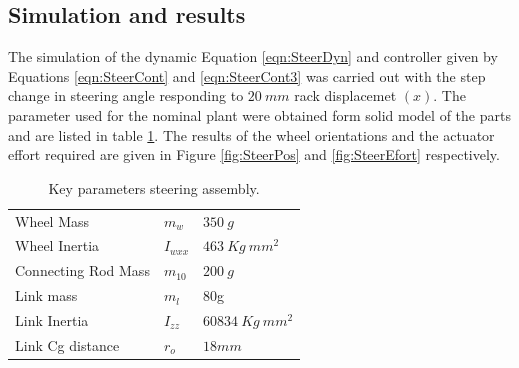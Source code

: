 \subsection{Simulation and results}
The simulation of the  dynamic Equation \ref{eqn:SteerDyn} and controller given by Equations \ref{eqn:SteerCont} and \ref{eqn:SteerCont3} was carried out with the step change in steering angle responding to $ 20~mm$  rack displacemet $(x)$.  The parameter used for the nominal plant were obtained form solid model of the parts and are listed in table \ref{tb:steerPara}. The results of the wheel orientations and the actuator effort required are given in Figure \ref{fig:SteerPos} and \ref{fig:SteerEfort} respectively.

\begin{table}[!htbp]
	\caption{Key parameters steering assembly.}
	\label{tb:steerPara}
	\centering
	\begin{tabular}{l l l }
		\hline
		
		Wheel Mass& $m_w $ &$ 350~g$  \\ 
		Wheel Inertia & $I_{wxx}$ & $463~ Kg ~mm^2$\\
		Connecting Rod Mass & $m_{10} $& $200~g$ \\
		Link mass& $m_l$ & 80g\\
		Link Inertia & $I_{zz} $& $60834~Kg ~mm^2$\\
		Link Cg distance & $r_o$ & $18mm$\\
		\hline
	\end{tabular}
\end{table}

